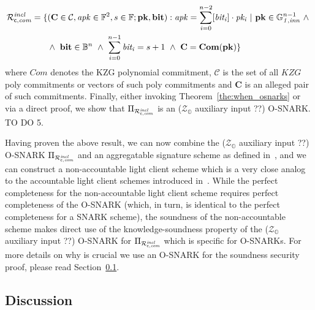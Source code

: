 \begin{align*}
 {\Rvtcom} = \{&(\mathbf{C} \in \mathcal{C}, \mathit{apk} \in \mathbb{F}^2, s \in \mathbb{F}; \mathbf{pk}, \mathbf{bit}) : 
                       \mathit{apk} = \sum_{i=0}^{n-2} [\mathit{bit_i}] \cdot \mathit{pk_i} \  | \ \mathbf{pk} \in \ginn{1}^{n-1} \ \wedge \  \\
                       & \wedge \ \mathbf{bit} \in \mathbb{B}^n \ \wedge \ \sum_{i=0}^{n-1} \mathit{bit_i} = s+1 \ \wedge \ \mathbf{C} = \mathbf{Com}(\mathbf{pk}) \} 
\end{align*}
\noindent where $\mathit{Com}$ denotes the KZG polynomial commitment, 
$\mathcal{C}$ is the set of all $\mathit{KZG}$ poly commitments or vectors of such poly commitments and $\mathbf{C}$ is an alleged pair of such commitments.
Finally, either invoking Theorem~\ref{the:when_osnarks} or via a direct proof, we show that 
$\Pi_{\mathcal{R}^{\mathit{incl}}_{\mathsf{c},\mathit{com}}}$ is an ($\mathcal{Z}_{\mathbb{O}}$ auxiliary input ??) O-SNARK. {\color{red} TO DO 5.}

\noindent Having proven the above result,  we can now combine the ($\mathcal{Z}_{\mathbb{O}}$ auxiliary input ??) O-SNARK
$\Pi_{\mathcal{R}^{\mathit{incl}}_{\mathsf{c},\mathit{com}}}$ and an aggregatable signature 
scheme as defined in~\cite{LC_paper}, and we can construct a non-accountable light client scheme which is a very close analog 
to the accountable light client schemes introduced in~\cite{LC_paper}. While the perfect completeness for the non-accountable light client scheme 
requires perfect completeness of the O-SNARK (which, in turn, is identical to the perfect completeness for a SNARK scheme), 
the soundness of the non-accountable scheme makes direct use of the knowledge-soundness 
property of the ($\mathcal{Z}_{\mathbb{O}}$ auxiliary input ??) O-SNARK for $\Pi_{\mathcal{R}^{\mathit{incl}}_{\mathsf{c},\mathit{com}}}$ which is specific for O-SNARKs. 
For more details on why is crucial we use an O-SNARK for the soundness security proof, please read Section~\ref{sec:discussion}.

\subsection{Discussion}
\label{sec:discussion}


